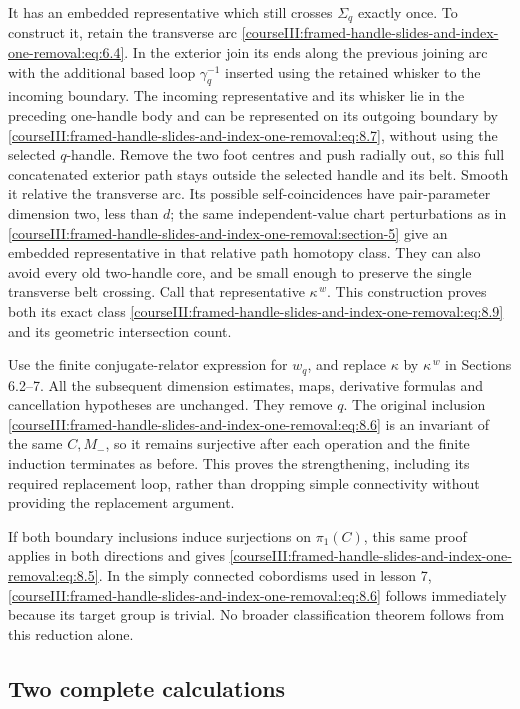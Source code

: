 It has an embedded representative which still crosses \(\Sigma_q\) exactly once. To construct it, retain the transverse arc \eqref{courseIII:framed-handle-slides-and-index-one-removal:eq:6.4}. In the exterior join its ends along the previous joining arc with the additional based loop \(\gamma_q^{-1}\) inserted using the retained whisker to the incoming boundary. The incoming representative and its whisker lie in the preceding one-handle body and can be represented on its outgoing boundary by \eqref{courseIII:framed-handle-slides-and-index-one-removal:eq:8.7}, without using the selected \(q\)-handle. Remove the two foot centres and push radially out, so this full concatenated exterior path stays outside the selected handle and its belt. Smooth it relative the transverse arc. Its possible self-coincidences have pair-parameter dimension two, less than \(d\); the same independent-value chart perturbations as in \cref{courseIII:framed-handle-slides-and-index-one-removal:section-5} give an embedded representative in that relative path homotopy class. They can also avoid every old two-handle core, and be small enough to preserve the single transverse belt crossing. Call that representative \(\kappa^{\,w}\). This construction proves both its exact class \eqref{courseIII:framed-handle-slides-and-index-one-removal:eq:8.9} and its geometric intersection count.

Use the finite conjugate-relator expression for \(w_q\), and replace \(\kappa\) by \(\kappa^{\,w}\) in Sections 6.2--7. All the subsequent dimension estimates, maps, derivative formulas and cancellation hypotheses are unchanged. They remove \(q\). The original inclusion \eqref{courseIII:framed-handle-slides-and-index-one-removal:eq:8.6} is an invariant of the same \(C,M_-\), so it remains surjective after each operation and the finite induction terminates as before. This proves the strengthening, including its required replacement loop, rather than dropping simple connectivity without providing the replacement argument.

If both boundary inclusions induce surjections on \(\pi_1(C)\), this same proof applies in both directions and gives \eqref{courseIII:framed-handle-slides-and-index-one-removal:eq:8.5}. In the simply connected cobordisms used in lesson 7, \eqref{courseIII:framed-handle-slides-and-index-one-removal:eq:8.6} follows immediately because its target group is trivial. No broader classification theorem follows from this reduction alone.

\subsection{Two complete calculations}
\label{courseIII:framed-handle-slides-and-index-one-removal:slide-exercises}

